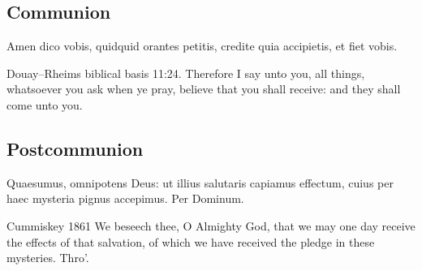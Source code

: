 \subsection{Communion}
\label{proper-communion}
\begin{latinproper}
Amen dico vobis, quidquid orantes petitis, credite quia accipietis, et fiet vobis.
\end{latinproper}
\begin{englishwitness}{Douay--Rheims biblical basis}
11:24. Therefore I say unto you, all things, whatsoever you ask when ye
pray, believe that you shall receive: and they shall come unto you.
\end{englishwitness}

\subsection{Postcommunion}
\label{proper-postcommunion}
\begin{latinproper}
Quaesumus, omnipotens Deus: ut illius salutaris capiamus effectum, cuius per haec mysteria pignus accepimus. Per Dominum.
\end{latinproper}
\begin{englishwitness}{Cummiskey 1861}
We beseech thee, O Almighty God, that we may one day receive the effects of that salvation, of which we have received the pledge in these mysteries. Thro'.
\end{englishwitness}
